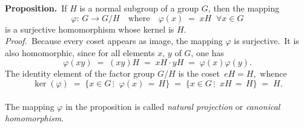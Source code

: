 \documentclass[12pt]{article}
\theoremstyle{definition}
\begin{document}
\textbf{Proposition.}\, If $H$ is a normal subgroup of a group $G$, then the mapping
$$\varphi\!:\, G \to G/H \quad \mbox{where} \quad \varphi(x) \;=\; xH \;\; \forall x \in G$$
is a surjective homomorphism whose kernel is $H$.\\


\emph{Proof.}\, Because every coset appears as image, the mapping $\varphi$ is surjective.\, It is also homomorphic, since for all elements $x,\,y$ of $G$, one has
$$\varphi(xy) \;=\; (xy)H \;=\; xH\!\cdot\!yH \;=\; \varphi(x)\varphi(y).$$
The identity element of the factor group $G/H$ is the coset \,$eH = H$,\, whence
$$\operatorname{ker}(\varphi) \;=\; \{x \in G\,\vdots\;\; \varphi(x) \,=\, H\} \;=\; \{x \in G\,\vdots\;\; xH \,=\, H\}
 \;=\; H.$$\\

The mapping $\varphi$ in the proposition is called \emph{natural projection} or \emph{canonical homomorphism}.



\end{document}
